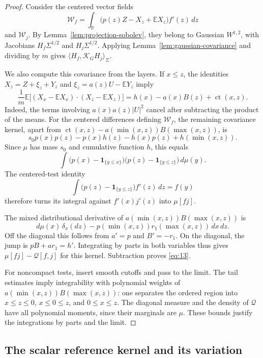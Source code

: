 \begin{proof}
Consider the centered vector fields
\[
 \mathcal W_f
    =\int_{\mathbb R}
       \bigl(p(z)Z-X_z+\mathbb E X_z\bigr)f'(z)\,dz
\]
and \(\mathcal W_j\). By Lemma~\ref{lem:projection-sobolev}, they
belong to Gaussian \(W^{1,2}\), with Jacobians
\(H_f\Sigma^{1/2}\) and \(H_j\Sigma^{1/2}\). Applying
Lemma~\ref{lem:gaussian-covariance} and dividing by \(m\) gives
\(\langle H_f,\mathcal K_GH_j\rangle_\Sigma\).

We also compute this covariance from the layers. If \(x\leq z\),
the identities \(X_z=Z+\xi_z+Y_z\) and
\(\xi_z=a(z)U-\mathbb E Y_z\) imply
\[
 \frac1m\mathbb E
   \bigl[(X_x-\mathbb E X_x)\cdot(X_z-\mathbb E X_z)\bigr]
   =h(x)-a(x)B(z)+\operatorname{ct}(x,z).
\]
Indeed, the terms involving \(a(x)a(z)|U|^2\) cancel after subtracting
the product of the means. For the centered differences defining
\(\mathcal W_f\), the remaining covariance kernel, apart from
\(\operatorname{ct}(x,z)-a(\min(x,z))B(\max(x,z))\), is
\[
 s_0p(x)p(z)-p(x)h(z)-h(x)p(z)+h(\min(x,z)).
\]
Since \(\mu\) has mass \(s_0\) and cumulative function \(h\), this
equals
\[
 \int
  \bigl(p(x)-\mathbf1_{\{y\leq x\}}\bigr)
  \bigl(p(z)-\mathbf1_{\{y\leq z\}}\bigr)\,d\mu(y).
\]
The centered-test identity
\[
 \int\bigl(p(z)-\mathbf1_{\{y\leq z\}}\bigr)f'(z)\,dz=f(y)
\]
therefore turns its integral against \(f'(x)j'(z)\) into \(\mu[fj]\).

The mixed distributional derivative of
\(a(\min(x,z))B(\max(x,z))\) is
\[
 d\mu(x)\,\delta_x(dz)
  -p(\min(x,z))r_1(\max(x,z))\,dx\,dz.
\]
Off the diagonal this follows from \(a'=p\) and \(B'=-r_1\).
On the diagonal, the jump is \(pB+a r_1=h'\).
Integrating by parts in both variables thus gives
\(\mu[fj]-\mathcal Q[f,j]\) for this kernel. Subtraction proves
\eqref{eq:13}.

For noncompact tests, insert smooth cutoffs and pass to the limit.
The tail estimates imply integrability with polynomial weights of
\(a(\min(x,z))B(\max(x,z))\): one separates the ordered region
into \(x\leq z\leq0\), \(x\leq0\leq z\), and
\(0\leq x\leq z\). The diagonal measure and the density of
\(\mathcal Q\) have all polynomial moments, since their marginals
are \(\mu\). These bounds justify the integrations by parts and the
limit.
\end{proof}

\subsection{The scalar reference kernel and its variation}

